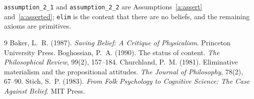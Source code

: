 \documentclass{situationist-preprint}
\begin{document}
\texttt{assumption\_2\_1} and \texttt{assumption\_2\_2} are Assumptions~\ref{a:assert} and~\ref{a:asserted}; \texttt{elim} is the content that there are no beliefs, and the remaining axioms are primitives.

\begin{thebibliography}{9}\small
{} Baker, L.~R. (1987). \emph{Saving Belief: A Critique of Physicalism}. Princeton University Press.
 Boghossian, P.~A. (1990). The status of content. \emph{The Philosophical Review}, 99(2), 157--184.
 Churchland, P.~M. (1981). Eliminative materialism and the propositional attitudes. \emph{The Journal of Philosophy}, 78(2), 67--90.
 Stich, S.~P. (1983). \emph{From Folk Psychology to Cognitive Science: The Case Against Belief}. MIT Press.
\end{thebibliography}
\end{document}

